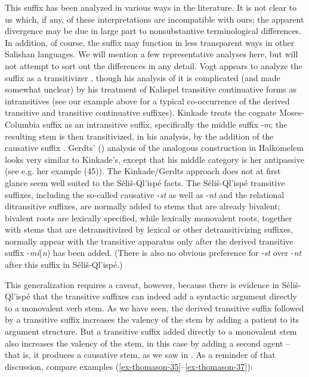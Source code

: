 \documentclass[output=paper,colorlinks,citecolor=brown]{langscibook}
\begin{document}
This suffix has been analyzed in various ways in the literature.  It
is not clear to us which, if any, of these interpretations are
incompatible with ours; the apparent divergence may be due in large
part to nonsubstantive terminological differences.  In addition, of
course, the suffix may function in less transparent ways in other
Salishan languages.  We will mention a few representative analyses
here, but will not attempt to sort out the differences in any detail.
Vogt appears to analyze the suffix as a transitivizer \citep[59--60]{Vogt:1940},
though his analysis of it is complicated (and made somewhat unclear)
by his treatment of Kalispel transitive continuative forms as
intransitives (see our example  above for a typical co-occurrence of the
derived transitive and transitive continuative suffixes).  Kinkade
treats the cognate Moses-Columbia suffix as an intransitive suffix,
specifically the middle suffix -\emph{m}; the resulting stem is then
transitivized, in his analysis, by the addition of the causative
suffix \citep[195]{Kinkade:1981}.  Gerdts' (\citeyear{Gerdts:1993}) analysis of the analogous
construction in Halkomelem looks very similar to Kinkade's, except
that his middle category is her antipassive (see e.g. her example (45)).
The Kinkade/Gerdts approach does not at first glance seem well suited
to the S\'eli\v{s}-Ql'isp\'e facts.  The S\'eli\v{s}-Ql'isp\'e
transitive suffixes, including the so-called causative -\emph{st} as
well as -\emph{nt} and the relational ditransitive suffixes, are normally
added to stems that are already bivalent; bivalent roots are
lexically specified, while lexically monovalent roots, together with
stems that are detransitivized by lexical or other detransitivizing
suffixes, normally appear with the transitive apparatus only after the
derived transitive suffix -\emph{m\'i}(\emph{n}) has been added.  (There
is also no obvious preference for -\emph{st} over -\emph{nt} after this
suffix in S\'eli\v{s}-Ql'isp\'e.)


This generalization requires a caveat, however, because there is
evidence in S\'eli\v{s}-Ql'isp\'e that the transitive suffixes can
indeed add a syntactic argument directly to a monovalent verb stem.
As we have seen, the derived transitive suffix followed by a
transitive suffix increases the valency of the stem by adding a
patient to its argument structure.  But a transitive suffix added
directly to a monovalent stem also increases the valency of the stem,
in this case by adding a second agent -- that is, it produces a
causative stem, as we saw in .  As a reminder of that
discussion, compare examples (\ref{ex-thomason-35}--\ref{ex-thomason-37}):
\end{document}
